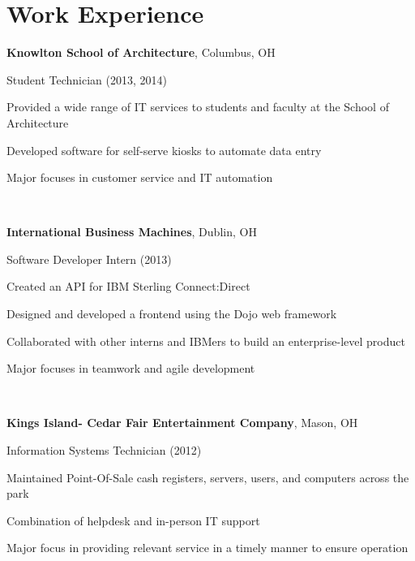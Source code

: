 \documentclass[letterpaper]{resume}
\begin{document}
\section{Work Experience}
\textbf{Knowlton School of Architecture}, Columbus, OH

Student Technician (2013, 2014)
\begin{compactitem}
\item Provided a wide range of IT services to students and faculty at the
	School of Architecture
\item Developed software for self-serve kiosks to automate data entry
\item Major focuses in customer service and IT automation
\end{compactitem}

~

\textbf{International Business Machines}, Dublin, OH

Software Developer Intern (2013)
\begin{compactitem}
\item Created an API for IBM Sterling Connect:Direct

\item Designed and developed a frontend using the Dojo web framework

\item Collaborated with other interns and IBMers to build an enterprise-level product

\item Major focuses in teamwork and agile development
\end{compactitem}

~

\textbf{Kings Island- Cedar Fair Entertainment Company}, Mason, OH

Information Systems Technician (2012)
\begin{compactitem}
\item Maintained Point-Of-Sale cash registers, servers, users, and computers across the park

\item Combination of helpdesk and in-person IT support


\item Major focus in providing relevant service in a timely manner to ensure operation
\end{compactitem}
\end{document}

